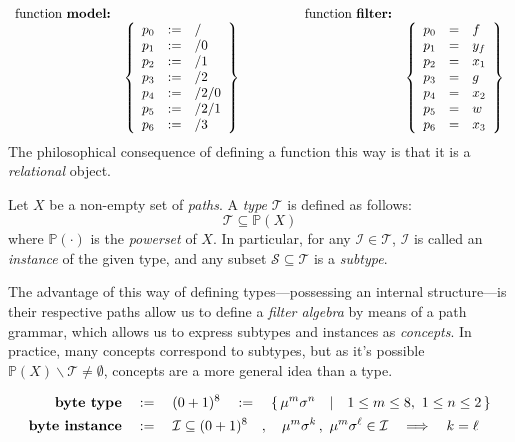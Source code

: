 \documentclass[twoside]{article}
\newcommand{\then}{\ensuremath{\quad\Longrightarrow\quad}}
\newcommand{\quadbar}{\ensuremath{\quad |\quad}}
\newcommand{\quadcomma}{\ensuremath{\quad ,\quad}}
\newcommand{\defequals}{\ensuremath{\quad :=\quad}}
\begin{document}
$$ \begin{array}{rlrl}
 \mbox{function \bfseries model:}	&			&  \qquad\qquad \mbox{function \bfseries filter:}	\\
 & \left\{\begin{array}{rcl}
   p_0	& :=		& /						\\
   p_1	& :=		& /0						\\
   p_2	& :=		& /1						\\
   p_3	& :=		& /2						\\
   p_4	& :=		& /2/0						\\
   p_5	& :=		& /2/1						\\
   p_6	& :=		& /3						\\
   \end{array}\right\} && \left\{\begin{array}{rcl}
   p_0	& =		& f						\\
   p_1	& =		& y_f						\\
   p_2	& =		& x_1						\\
   p_3	& =		& g						\\
   p_4	& =		& x_2						\\
   p_5	& =		& w						\\
   p_6	& =		& x_3						\\
   \end{array}\right\}
\end{array} $$
The philosophical consequence of defining a function this way is that it is a \emph{relational} object.


Let $ X $ be a non-empty set of \emph{paths}. A \emph{type} $ \mathcal{T} $ is defined as follows:
$$ \mathcal{T} \subseteq \mathbb{P}(X) $$
where $ \mathbb{P}(\cdot) $ is the \emph{powerset} of $ X $.
In particular, for any $ \mathcal{I}\in\mathcal{T} $, $ \mathcal{I} $ is called an \emph{instance}
of the given type, and any subset $ \mathcal{S}\subseteq\mathcal{T} $ is a \emph{subtype}.

The advantage of this way of defining types---possessing an internal structure---is their respective paths allow us to define
a \emph{filter algebra} by means of a path grammar, which allows us to express subtypes and instances as \emph{concepts}.
In practice, many concepts correspond to subtypes, but as it's possible $ \mathbb{P}(X)\backslash\mathcal{T}\neq\emptyset $,
concepts are a more general idea than a type.

\begin{align*}
\mbox{\bf byte type}		& \defequals (0+1)^8 \defequals \{\, \mu^m\sigma^n \quadbar 1\le m\le 8,\ 1\le n\le 2 \,\}		\\
\mbox{\bf byte instance}	& \defequals \mathcal{I} \subseteq (0+1)^8 \quadcomma
					     \mu^m\sigma^k\,,\ \mu^m\sigma^\ell \in \mathcal{I} \then k = \ell
\end{align*}
\end{document}
